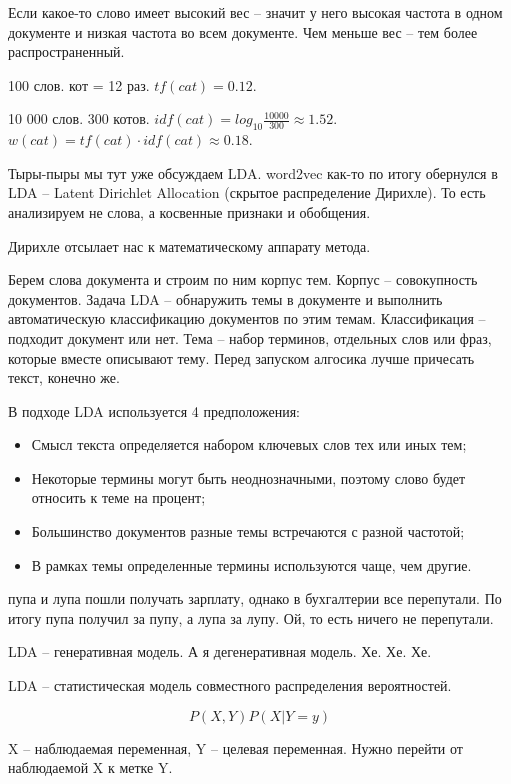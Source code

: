 Если какое-то слово имеет высокий вес -- значит у него высокая частота в одном документе и низкая частота во всем документе.
Чем меньше вес -- тем более распространенный.

100 слов. кот = 12 раз. $tf(cat) = 0.12$.

10 000 слов. 300 котов. $idf(cat) = log_{10}\frac{10 000}{300} \approx 1.52$. $w(cat) = tf(cat) \cdot idf(cat) \approx 0.18$.

Тыры-пыры мы тут уже обсуждаем LDA. word2vec как-то по итогу обернулся в LDA -- Latent Dirichlet Allocation (скрытое распределение Дирихле). То есть анализируем не слова, а косвенные признаки и обобщения.

Дирихле отсылает нас к математическому аппарату метода. 

Берем слова документа и строим по ним корпус тем. Корпус -- совокупность документов. Задача LDA -- обнаружить темы в документе и выполнить автоматическую классификацию документов по этим темам. Классификация -- подходит документ или нет. Тема -- набор терминов, отдельных слов или фраз, которые вместе описывают тему. Перед запуском алгосика лучше причесать текст, конечно же.

В подходе LDA используется 4 предположения:
\begin{itemize}
    \item Смысл текста определяется набором ключевых слов тех или иных тем;
    \item Некоторые термины могут быть неоднозначными, поэтому слово будет относить к теме на процент;
    \item Большинство документов разные темы встречаются с разной частотой;
    \item В рамках темы определенные термины используются чаще, чем другие.
\end{itemize}

пупа и лупа пошли получать зарплату, однако в бухгалтерии все перепутали. По итогу пупа получил за пупу, а лупа за лупу. Ой, то есть ничего не перепутали.

LDA -- генеративная модель. А я дегенеративная модель. Хе. Хе. Хе.

LDA -- статистическая модель совместного распределения вероятностей.

\begin{equation}
    P(X, Y)

    P(X | Y=y)
\end{equation}

X -- наблюдаемая переменная, Y -- целевая переменная. Нужно перейти от наблюдаемой X к метке Y.

